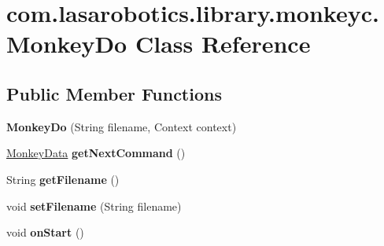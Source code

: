 \hypertarget{classcom_1_1lasarobotics_1_1library_1_1monkeyc_1_1_monkey_do}{}\section{com.\+lasarobotics.\+library.\+monkeyc.\+Monkey\+Do Class Reference}
\label{classcom_1_1lasarobotics_1_1library_1_1monkeyc_1_1_monkey_do}
\subsection*{Public Member Functions}
\begin{DoxyCompactItemize}
\item 
\hypertarget{classcom_1_1lasarobotics_1_1library_1_1monkeyc_1_1_monkey_do_a66c4ab0129f080ad2c9521dc4d9948bd}{}{\bfseries Monkey\+Do} (String filename, Context context)\label{classcom_1_1lasarobotics_1_1library_1_1monkeyc_1_1_monkey_do_a66c4ab0129f080ad2c9521dc4d9948bd}

\item 
\hypertarget{classcom_1_1lasarobotics_1_1library_1_1monkeyc_1_1_monkey_do_ab4fabec0eb0155486246174f5bb59fcf}{}\hyperlink{classcom_1_1lasarobotics_1_1library_1_1monkeyc_1_1_monkey_data}{Monkey\+Data} {\bfseries get\+Next\+Command} ()\label{classcom_1_1lasarobotics_1_1library_1_1monkeyc_1_1_monkey_do_ab4fabec0eb0155486246174f5bb59fcf}

\item 
\hypertarget{classcom_1_1lasarobotics_1_1library_1_1monkeyc_1_1_monkey_do_a5129f21484decf70a61ff92881b975bf}{}String {\bfseries get\+Filename} ()\label{classcom_1_1lasarobotics_1_1library_1_1monkeyc_1_1_monkey_do_a5129f21484decf70a61ff92881b975bf}

\item 
\hypertarget{classcom_1_1lasarobotics_1_1library_1_1monkeyc_1_1_monkey_do_a60cdcde0db055c683338a0a6523586fb}{}void {\bfseries set\+Filename} (String filename)\label{classcom_1_1lasarobotics_1_1library_1_1monkeyc_1_1_monkey_do_a60cdcde0db055c683338a0a6523586fb}

\item 
\hypertarget{classcom_1_1lasarobotics_1_1library_1_1monkeyc_1_1_monkey_do_aea7beeeb5cdd018aa05e49b030eb9b9b}{}void {\bfseries on\+Start} ()\label{classcom_1_1lasarobotics_1_1library_1_1monkeyc_1_1_monkey_do_aea7beeeb5cdd018aa05e49b030eb9b9b}

\end{DoxyCompactItemize}


